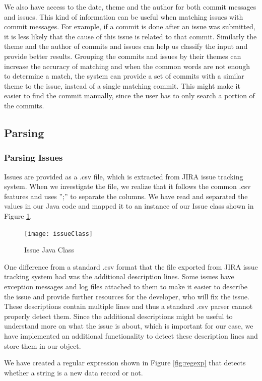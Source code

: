 We also have access to the date, theme and the author for both commit messages and issues. This kind of information can be useful when matching issues with commit messages. For example, if a commit is done after an issue was submitted, it is less likely that the cause of this issue is related to that commit. Similarly the theme and the author of commits and issues can help us classify the input and provide better results. Grouping the commits and issues by their themes can increase the accuracy of matching and when the common words are not enough to determine a match, the system can provide a set of commits with a similar theme to the issue, instead of a single matching commit. This might make it easier to find the commit manually, since the user has to only search a portion of the commits.

\subsection{Parsing}

\subsubsection{Parsing Issues}
Issues are provided as a .csv file, which is extracted from JIRA issue tracking system. When we investigate the file, we realize that it follows the common .csv features and uses '';'' to separate the columns. We have read and separated the values in our Java code and mapped it to an instance of our Issue class shown in Figure \ref{fig:issue}. 

\begin{figure}
\centering
\texttt{[image: issueClass]}
\caption{Issue Java Class}
\label{fig:issue}
\end{figure}

One difference from a standard .csv format that the file exported from JIRA issue tracking system had was the additional description lines. Some issues have exception messages and log files attached to them to make it easier to describe the issue and provide further resources for the developer, who will fix the issue. These descriptions contain multiple lines and thus a standard .csv parser cannot properly detect them. Since the additional descriptions might be useful to understand more on what the issue is about, which is important for our case, we have implemented an additional functionality to detect these description lines and store them in our object.

We have created a regular expression shown in Figure \ref{fig:regexp} that detects whether a string is a new data record or not.

